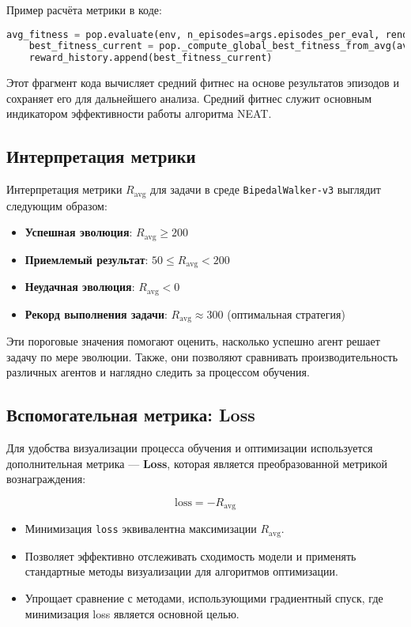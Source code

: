 \documentclass[a4paper,12pt]{article}
\begin{document}
Пример расчёта метрики в коде:

\begin{lstlisting}[language=Python]
    avg_fitness = pop.evaluate(env, n_episodes=args.episodes_per_eval, render=False)
    best_fitness_current = pop._compute_global_best_fitness_from_avg(avg_fitness)
    reward_history.append(best_fitness_current)
\end{lstlisting}

Этот фрагмент кода вычисляет средний фитнес на основе результатов эпизодов и сохраняет его для дальнейшего анализа. Средний фитнес служит основным индикатором эффективности работы алгоритма NEAT.

\subsection{Интерпретация метрики}

Интерпретация метрики $R_{\text{avg}}$ для задачи в среде \texttt{BipedalWalker-v3} выглядит следующим образом:
\begin{itemize}
    \item \textbf{Успешная эволюция}: $R_{\text{avg}} \geq 200$
    \item \textbf{Приемлемый результат}: $50 \leq R_{\text{avg}} < 200$
    \item \textbf{Неудачная эволюция}: $R_{\text{avg}} < 0$
    \item \textbf{Рекорд выполнения задачи}: $R_{\text{avg}} \approx 300$ (оптимальная стратегия)
\end{itemize}

Эти пороговые значения помогают оценить, насколько успешно агент решает задачу по мере эволюции. Также, они позволяют сравнивать производительность различных агентов и наглядно следить за процессом обучения.

\subsection{Вспомогательная метрика: Loss}

Для удобства визуализации процесса обучения и оптимизации используется дополнительная метрика — \textbf{Loss}, которая является преобразованной метрикой вознаграждения:

\[
\text{loss} = -R_{\text{avg}}
\]

\begin{itemize}
    \item Минимизация \texttt{loss} эквивалентна максимизации $R_{\text{avg}}$.
    \item Позволяет эффективно отслеживать сходимость модели и применять стандартные методы визуализации для алгоритмов оптимизации.
    \item Упрощает сравнение с методами, использующими градиентный спуск, где минимизация loss является основной целью.
\end{itemize}
\end{document}
